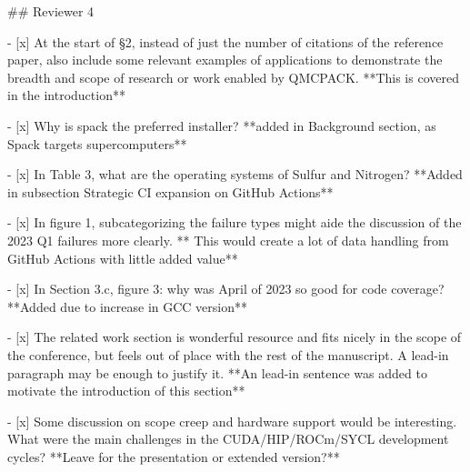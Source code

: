 \begin{markdown}
## Reviewer 4

- [x] At the start of §2, instead of just the number of citations of the reference paper, also include some relevant examples of applications to demonstrate the breadth and scope of research or work enabled by
QMCPACK. **This is covered in the introduction**
   
- [x] Why is spack the preferred installer? **added in Background section, as Spack targets supercomputers**

- [x] In Table 3, what are the operating systems of Sulfur and Nitrogen? **Added in subsection Strategic CI expansion on GitHub Actions**

- [x] In figure 1, subcategorizing the failure types might aide the discussion of the 2023 Q1 failures more clearly. ** This would create a lot of data handling from GitHub Actions with little added value**

- [x] In Section 3.c, figure 3: why was April of 2023 so good for code coverage? **Added due to increase in GCC version**

- [x] The related work section is wonderful resource and fits nicely in the scope of the conference, but feels out of place with the rest of the manuscript. A lead-in paragraph may be enough to justify it. **An lead-in sentence was added to motivate the introduction of this section**

- [x] Some discussion on scope creep and hardware support would be interesting. What were the main challenges in the CUDA/HIP/ROCm/SYCL development cycles? **Leave for the presentation or extended version?**


\end{markdown}